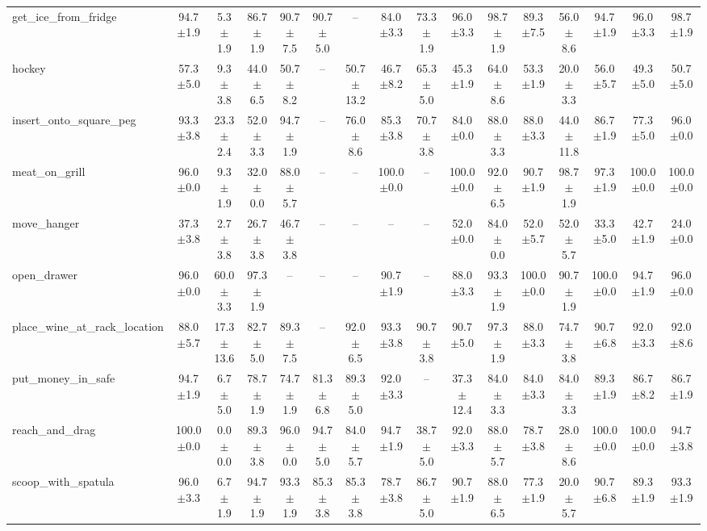 \begin{table}[t]
{\begin{tabular}{l*{15}{c}}
get\_ice\_from\_fridge & 94.7$\pm$1.9 & 5.3$\pm$1.9 & 86.7$\pm$1.9 & 90.7$\pm$7.5 & 90.7$\pm$5.0 & -- & 84.0$\pm$3.3 & 73.3$\pm$1.9 & 96.0$\pm$3.3 & 98.7$\pm$1.9 & 89.3$\pm$7.5 & 56.0$\pm$8.6 & 94.7$\pm$1.9 & 96.0$\pm$3.3 & 98.7$\pm$1.9 \\
hockey & 57.3$\pm$5.0 & 9.3$\pm$3.8 & 44.0$\pm$6.5 & 50.7$\pm$8.2 & -- & 50.7$\pm$13.2 & 46.7$\pm$8.2 & 65.3$\pm$5.0 & 45.3$\pm$1.9 & 64.0$\pm$8.6 & 53.3$\pm$1.9 & 20.0$\pm$3.3 & 56.0$\pm$5.7 & 49.3$\pm$5.0 & 50.7$\pm$5.0 \\
insert\_onto\_square\_peg & 93.3$\pm$3.8 & 23.3$\pm$2.4 & 52.0$\pm$3.3 & 94.7$\pm$1.9 & -- & 76.0$\pm$8.6 & 85.3$\pm$3.8 & 70.7$\pm$3.8 & 84.0$\pm$0.0 & 88.0$\pm$3.3 & 88.0$\pm$3.3 & 44.0$\pm$11.8 & 86.7$\pm$1.9 & 77.3$\pm$5.0 & 96.0$\pm$0.0 \\
meat\_on\_grill & 96.0$\pm$0.0 & 9.3$\pm$1.9 & 32.0$\pm$0.0 & 88.0$\pm$5.7 & -- & -- & 100.0$\pm$0.0 & -- & 100.0$\pm$0.0 & 92.0$\pm$6.5 & 90.7$\pm$1.9 & 98.7$\pm$1.9 & 97.3$\pm$1.9 & 100.0$\pm$0.0 & 100.0$\pm$0.0 \\
move\_hanger & 37.3$\pm$3.8 & 2.7$\pm$3.8 & 26.7$\pm$3.8 & 46.7$\pm$3.8 & -- & -- & -- & -- & 52.0$\pm$0.0 & 84.0$\pm$0.0 & 52.0$\pm$5.7 & 52.0$\pm$5.7 & 33.3$\pm$5.0 & 42.7$\pm$1.9 & 24.0$\pm$0.0 \\
open\_drawer & 96.0$\pm$0.0 & 60.0$\pm$3.3 & 97.3$\pm$1.9 & -- & -- & -- & 90.7$\pm$1.9 & -- & 88.0$\pm$3.3 & 93.3$\pm$1.9 & 100.0$\pm$0.0 & 90.7$\pm$1.9 & 100.0$\pm$0.0 & 94.7$\pm$1.9 & 96.0$\pm$0.0 \\
place\_wine\_at\_rack\_location & 88.0$\pm$5.7 & 17.3$\pm$13.6 & 82.7$\pm$5.0 & 89.3$\pm$7.5 & -- & 92.0$\pm$6.5 & 93.3$\pm$3.8 & 90.7$\pm$3.8 & 90.7$\pm$5.0 & 97.3$\pm$1.9 & 88.0$\pm$3.3 & 74.7$\pm$3.8 & 90.7$\pm$6.8 & 92.0$\pm$3.3 & 92.0$\pm$8.6 \\
put\_money\_in\_safe & 94.7$\pm$1.9 & 6.7$\pm$5.0 & 78.7$\pm$1.9 & 74.7$\pm$1.9 & 81.3$\pm$6.8 & 89.3$\pm$5.0 & 92.0$\pm$3.3 & -- & 37.3$\pm$12.4 & 84.0$\pm$3.3 & 84.0$\pm$3.3 & 84.0$\pm$3.3 & 89.3$\pm$1.9 & 86.7$\pm$8.2 & 86.7$\pm$1.9 \\
reach\_and\_drag & 100.0$\pm$0.0 & 0.0$\pm$0.0 & 89.3$\pm$3.8 & 96.0$\pm$0.0 & 94.7$\pm$5.0 & 84.0$\pm$5.7 & 94.7$\pm$1.9 & 38.7$\pm$5.0 & 92.0$\pm$3.3 & 88.0$\pm$5.7 & 78.7$\pm$3.8 & 28.0$\pm$8.6 & 100.0$\pm$0.0 & 100.0$\pm$0.0 & 94.7$\pm$3.8 \\
scoop\_with\_spatula & 96.0$\pm$3.3 & 6.7$\pm$1.9 & 94.7$\pm$1.9 & 93.3$\pm$1.9 & 85.3$\pm$3.8 & 85.3$\pm$3.8 & 78.7$\pm$3.8 & 86.7$\pm$5.0 & 90.7$\pm$1.9 & 88.0$\pm$6.5 & 77.3$\pm$1.9 & 20.0$\pm$5.7 & 90.7$\pm$6.8 & 89.3$\pm$1.9 & 93.3$\pm$1.9 \\

\end{tabular}}
\end{table}
